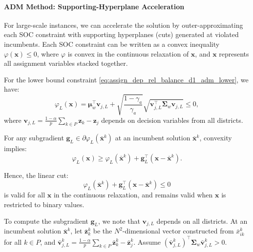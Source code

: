 \documentclass[preprint,12pt,authoryear]{elsarticle}
\begin{document}
\paragraph{ADM Method: Supporting-Hyperplane Acceleration}
For large-scale instances, we can accelerate the solution by outer-approximating each SOC constraint with supporting hyperplanes (cuts) generated at violated incumbents. Each SOC constraint can be written as a convex inequality $\varphi(\mathbf{x}) \leqslant 0$, where $\varphi$ is convex in the continuous relaxation of $\mathbf{x}$, and $\mathbf{x}$ represents all assignment variables stacked together.

For the lower bound constraint \eqref{eq:assign_dep_rel_balance_d1_adm_lower}, we have:
\begin{equation}
\varphi_L(\mathbf{x}) = \boldsymbol{\mu}_w^\top \mathbf{v}_{j,L} + \sqrt{\frac{1-\gamma_a}{\gamma_a}} \sqrt{\mathbf{v}_{j,L}^\top \boldsymbol{\Sigma}_w \mathbf{v}_{j,L}} \leqslant 0,
\label{eq:assign_dep_rel_phi_L}
\end{equation}
where $\mathbf{v}_{j,L} = \frac{1-\alpha}{p}\sum_{k \in P} \mathbf{z}_k - \mathbf{z}_j$ depends on decision variables from all districts.

For any subgradient $\mathbf{g}_L \in \partial \varphi_L(\bar{\mathbf{x}}^k)$ at an incumbent solution $\bar{\mathbf{x}}^k$, convexity implies:
\begin{equation}
\varphi_L(\mathbf{x}) \geqslant \varphi_L(\bar{\mathbf{x}}^k) + \mathbf{g}_L^\top (\mathbf{x} - \bar{\mathbf{x}}^k).
\end{equation}

Hence, the linear cut:
\begin{equation}
\varphi_L(\bar{\mathbf{x}}^k) + \mathbf{g}_L^\top (\mathbf{x} - \bar{\mathbf{x}}^k) \leqslant 0
\label{eq:assign_dep_rel_supporting_cut_lower}
\end{equation}
is valid for all $\mathbf{x}$ in the continuous relaxation, and remains valid when $\mathbf{x}$ is restricted to binary values.

To compute the subgradient $\mathbf{g}_L$, we note that $\mathbf{v}_{j,L}$ depends on all districts. At an incumbent solution $\bar{\mathbf{x}}^k$, let $\bar{\mathbf{z}}_k^k$ be the $N^2$-dimensional vector constructed from $\bar{x}_{ik}^k$ for all $k \in P$, and $\bar{\mathbf{v}}_{j,L}^k = \frac{1-\alpha}{p}\sum_{k \in P} \bar{\mathbf{z}}_k^k - \bar{\mathbf{z}}_j^k$. Assume $(\bar{\mathbf{v}}_{j,L}^k)^\top \boldsymbol{\Sigma}_w \bar{\mathbf{v}}_{j,L}^k > 0$. 
\end{document}
